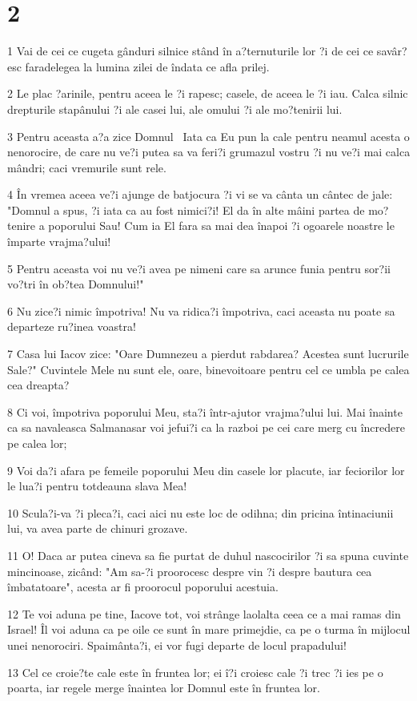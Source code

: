 \chapter{2}

\par 1 Vai de cei ce cugeta gânduri silnice stând în a?ternuturile lor ?i de cei ce savâr?esc faradelegea la lumina zilei de îndata ce afla prilej.
\par 2 Le plac ?arinile, pentru aceea le ?i rapesc; casele, de aceea le ?i iau. Calca silnic drepturile stapânului ?i ale casei lui, ale omului ?i ale mo?tenirii lui.
\par 3 Pentru aceasta a?a zice Domnul  Iata ca Eu pun la cale pentru neamul acesta o nenorocire, de care nu ve?i putea sa va feri?i grumazul vostru ?i nu ve?i mai calca mândri; caci vremurile sunt rele.
\par 4 În vremea aceea ve?i ajunge de batjocura ?i vi se va cânta un cântec de jale: "Domnul a spus, ?i iata ca au fost nimici?i! El da în alte mâini partea de mo?tenire a poporului Sau! Cum ia El fara sa mai dea înapoi ?i ogoarele noastre le împarte vrajma?ului!
\par 5 Pentru aceasta voi nu ve?i avea pe nimeni care sa arunce funia pentru sor?ii vo?tri în ob?tea Domnului!"
\par 6 Nu zice?i nimic împotriva! Nu va ridica?i împotriva, caci aceasta nu poate sa departeze ru?inea voastra!
\par 7 Casa lui Iacov zice: "Oare Dumnezeu a pierdut rabdarea? Acestea sunt lucrurile Sale?" Cuvintele Mele nu sunt ele, oare, binevoitoare pentru cel ce umbla pe calea cea dreapta?
\par 8 Ci voi, împotriva poporului Meu, sta?i într-ajutor vrajma?ului lui. Mai înainte ca sa navaleasca Salmanasar voi jefui?i ca la razboi pe cei care merg cu încredere pe calea lor;
\par 9 Voi da?i afara pe femeile poporului Meu din casele lor placute, iar feciorilor lor le lua?i pentru totdeauna slava Mea!
\par 10 Scula?i-va ?i pleca?i, caci aici nu este loc de odihna; din pricina întinaciunii lui, va avea parte de chinuri grozave.
\par 11 O! Daca ar putea cineva sa fie purtat de duhul nascocirilor ?i sa spuna cuvinte mincinoase, zicând: "Am sa-?i proorocesc despre vin ?i despre bautura cea îmbatatoare", acesta ar fi proorocul poporului acestuia.
\par 12 Te voi aduna pe tine, Iacove tot, voi strânge laolalta ceea ce a mai ramas din Israel! Îl voi aduna ca pe oile ce sunt în mare primejdie, ca pe o turma în mijlocul unei nenorociri. Spaimânta?i, ei vor fugi departe de locul prapadului!
\par 13 Cel ce croie?te cale este în fruntea lor; ei î?i croiesc cale ?i trec ?i ies pe o poarta, iar regele merge înaintea lor Domnul este în fruntea lor.

